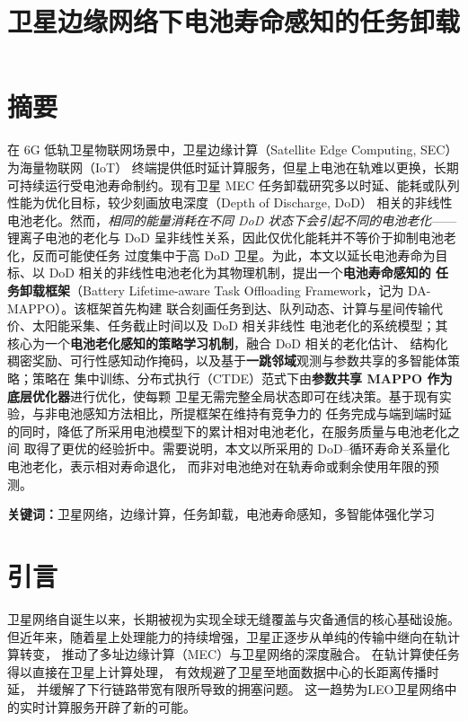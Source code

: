 \documentclass[a4paper,11pt]{article}
\begin{document}
\title{卫星边缘网络下电池寿命感知的任务卸载}
\author{}
\date{}
\maketitle

\section{摘要}

在 6G 低轨卫星物联网场景中，卫星边缘计算（Satellite Edge Computing, SEC）为海量物联网（IoT）
终端提供低时延计算服务，但星上电池在轨难以更换，长期可持续运行受电池寿命制约。现有卫星 MEC
任务卸载研究多以时延、能耗或队列性能为优化目标，较少刻画放电深度（Depth of Discharge, DoD）
相关的非线性电池老化。然而，\emph{相同的能量消耗在不同 DoD 状态下会引起不同的电池老化}——
锂离子电池的老化与 DoD 呈非线性关系，因此仅优化能耗并不等价于抑制电池老化，反而可能使任务
过度集中于高 DoD 卫星。为此，本文以延长电池寿命为目标、以 DoD 相关的非线性电池老化为其物理机制，提出一个\textbf{电池寿命感知的
任务卸载框架}（Battery Lifetime-aware Task Offloading Framework，记为 DA-MAPPO）。该框架首先构建
联合刻画任务到达、队列动态、计算与星间传输代价、太阳能采集、任务截止时间以及 DoD 相关非线性
电池老化的系统模型；其核心为一个\textbf{电池老化感知的策略学习机制}，融合 DoD 相关的老化估计、
结构化稠密奖励、可行性感知动作掩码，以及基于\textbf{一跳邻域}观测与参数共享的多智能体策略；策略在
集中训练、分布式执行（CTDE）范式下由\textbf{参数共享 MAPPO 作为底层优化器}进行优化，使每颗
卫星无需完整全局状态即可在线决策。基于现有实验，与非电池感知方法相比，所提框架在维持有竞争力的
任务完成与端到端时延的同时，降低了所采用电池模型下的累计相对电池老化，在服务质量与电池老化之间
取得了更优的经验折中。需要说明，本文以所采用的 DoD--循环寿命关系量化电池老化，表示相对寿命退化，
而非对电池绝对在轨寿命或剩余使用年限的预测。

\noindent\textbf{关键词：}卫星网络，边缘计算，任务卸载，电池寿命感知，多智能体强化学习

\section{引言}

卫星网络自诞生以来，长期被视为实现全球无缝覆盖与灾备通信的核心基础设施。
但近年来，随着星上处理能力的持续增强，卫星正逐步从单纯的传输中继向在轨计算转变，
推动了多址边缘计算（MEC）与卫星网络的深度融合\cite{zhang2024mhspo}。
在轨计算使任务得以直接在卫星上计算处理，
有效规避了卫星至地面数据中心的长距离传播时延，
并缓解了下行链路带宽有限所导致的拥塞问题。
这一趋势为LEO卫星网络中的实时计算服务开辟了新的可能。
\end{document}
